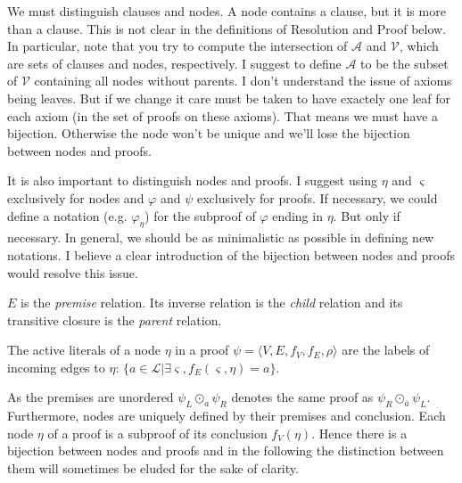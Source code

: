 \documentclass{llncs}
\newcommand{\dual}[1]{{\ensuremath{\bar{#1}}}}
\newenvironment{jogo}{\color{teal}}{}
\newenvironment{bruno}{\color{blue}}{}
\begin{document}
\begin{bruno}
We must distinguish clauses and nodes. A node contains a clause, but it is more than a clause.
This is not clear in the definitions of Resolution and Proof below. In particular, note that you try
to compute the intersection of $\mathcal{A}$ and $\mathcal{V}$, which are sets of clauses and nodes,
respectively. I suggest to define $\mathcal{A}$ to be the subset of $\mathcal{V}$ containing all
nodes without parents.
\end{bruno}
\begin{jogo}
I don't understand the issue of axioms being leaves. But if we change it care must be taken to
have exactely one leaf for each axiom (in the set of proofs on these axioms). That means we must
have a bijection. Otherwise the node won't be unique and we'll lose the bijection between nodes and
proofs.
\end{jogo}

\begin{bruno}
It is also important to distinguish nodes and proofs. I suggest using $\eta$ and $\varsigma$
exclusively for nodes and $\varphi$ and $\psi$ exclusively for proofs. If necessary, we could define
a notation (e.g. $\varphi_{\eta}$) for the subproof of $\varphi$ ending in $\eta$. But only if
necessary. In general, we should be as minimalistic as possible in defining new notations.
\end{bruno}
\begin{jogo}
I believe a clear introduction of the bijection between nodes and proofs would resolve this issue.
\end{jogo}

$E$ is the \emph{premise} relation. Its inverse relation is the \emph{child} relation and its
transitive closure is the \emph{parent} relation. 

\begin{definition}
The active literals of a node $\eta$ in a proof $\psi = \langle V,E,f_V,f_E,\rho \rangle$ are the
labels of incoming edges to $\eta$: $\{a \in \mathcal{L} | \exists \varsigma, f_E(\varsigma,\eta) =
a\}$.
\end{definition}

As the premises are unordered $\psi_L \odot_a \psi_R$ denotes the same proof as $\psi_R
\odot_\dual{a} \psi_L$.  Furthermore, nodes are uniquely defined by their premises and conclusion.
Each node $\eta$ of a proof is a subproof of its conclusion $f_V(\eta)$.  Hence there is a bijection
between nodes and proofs and in the following the distinction between them will sometimes be eluded
for the sake of clarity.
\end{document}
